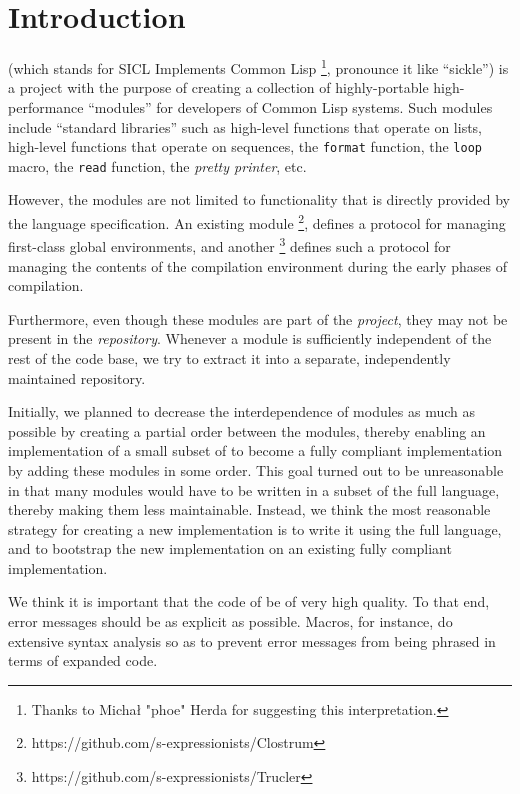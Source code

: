 
\chapter{Introduction}
%

\sysname{} (which stands for SICL Implements Common Lisp%
\footnote{Thanks to Michał "phoe" Herda for suggesting this
  interpretation.}, pronounce it like ``sickle'') is a project with
the purpose of creating a collection of highly-portable
high-performance ``modules'' for developers of Common Lisp systems.
Such modules include ``standard libraries'' such as high-level
functions that operate on lists, high-level functions that operate on
sequences, the \texttt{format} function, the \texttt{loop} macro, the
\texttt{read} function, the \emph{pretty printer}, etc.

However, the modules are not limited to functionality that is directly
provided by the \commonlisp{} language specification.  An existing
module%
\footnote{https://github.com/s-expressionists/Clostrum},
defines a \clos{} protocol for managing first-class global
environments, and another%
\footnote{https://github.com/s-expressionists/Trucler}
defines such a protocol for managing
the contents of the compilation environment during the early phases of
compilation.

Furthermore, even though these modules are part of the \sysname{}
\emph{project}, they may not be present in the \sysname{}
\emph{repository}.  Whenever a module is sufficiently independent of
the rest of the \sysname{} code base, we try to extract it into a
separate, independently maintained repository.

Initially, we planned to decrease the interdependence of modules as
much as possible by creating a partial order between the modules,
thereby enabling an implementation of a small subset of \commonlisp{}
to become a fully compliant implementation by adding these modules in
some order.  This goal turned out to be unreasonable in that many
modules would have to be written in a subset of the full language,
thereby making them less maintainable.  Instead, we think the most
reasonable strategy for creating a new \commonlisp{} implementation is
to write it using the full language, and to bootstrap the new
implementation on an existing fully compliant implementation.

We think it is important that the code of
\sysname{} be of very high quality.  To that end, error messages
should be as explicit as possible.  Macros, for instance, do extensive
syntax analysis so as to prevent error messages from being phrased in
terms of expanded code.

